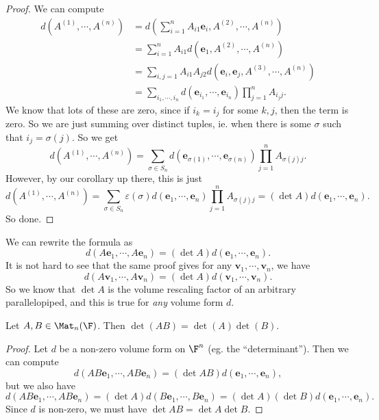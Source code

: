 \documentclass[a4paper]{article}
\begin{document}
\begin{proof}
  We can compute
  \begin{align*}
    d(A^{(1)}, \cdots, A^{(n)}) &= d\left(\sum_{i = 1}^n A_{i1} \mathbf{e}_i, A^{(2)}, \cdots, A^{(n)}\right)\\
    &= \sum_{i = 1}^n A_{i1} d(\mathbf{e}_1, A^{(2)}, \cdots, A^{(n)})\\
    &= \sum_{i, j = 1}A_{i1}A_{j2}d(\mathbf{e}_i, \mathbf{e}_j, A^{(3)}, \cdots, A^{(n)})\\
    &= \sum_{i_1, \cdots, i_n} d(\mathbf{e}_{i_1}, \cdots, \mathbf{e}_{i_n})\prod_{j = 1}^n A_{i_j j}.
  \end{align*}
  We know that lots of these are zero, since if $i_k = i_j$ for some $k, j$, then the term is zero. So we are just summing over distinct tuples, ie. when there is some $\sigma$ such that $i_j = \sigma(j)$. So we get
  \[
    d(A^{(1)}, \cdots, A^{(n)}) = \sum_{\sigma \in S_n} d(\mathbf{e}_{\sigma(1)}, \cdots, \mathbf{e}_{\sigma(n)})\prod_{j = 1}^n A_{\sigma(j)j}.
  \]
  However, by our corollary up there, this is just
  \[
    d(A^{(1)}, \cdots, A^{(n)}) = \sum_{\sigma \in S_n} \varepsilon(\sigma) d(\mathbf{e}_1, \cdots, \mathbf{e}_n) \prod_{j = 1}^n A_{\sigma(j)j} = (\det A) d(\mathbf{e}_1, \cdots, \mathbf{e}_n).
  \]
  So done.
\end{proof}
We can rewrite the formula as
\[
  d (A \mathbf{e}_1, \cdots, A\mathbf{e}_n) = (\det A)d(\mathbf{e}_1, \cdots, \mathbf{e}_n).
\]
It is not hard to see that the same proof gives for any $\mathbf{v}_1, \cdots, \mathbf{v}_n$, we have
\[
  d(A\mathbf{v}_1, \cdots, A\mathbf{v}_n) = (\det A)d(\mathbf{v}_1, \cdots, \mathbf{v}_n).
\]
So we know that $\det A$ is the volume rescaling factor of an arbitrary parallelopiped, and this is true for \emph{any} volume form $d$.

\begin{thm}
  Let $A, B \in \Mat_n(\F)$. Then $\det(AB) = \det(A)\det(B)$.
\end{thm}

\begin{proof}
  Let $d$ be a non-zero volume form on $\F^n$ (eg. the ``determinant''). Then we can compute
  \[
    d(AB\mathbf{e}_1,\cdots , AB\mathbf{e}_n) = (\det AB) d(\mathbf{e}_1,\cdots, \mathbf{e}_n),
  \]
  but we also have
  \[
    d(AB\mathbf{e}_1, \cdots, AB\mathbf{e}_n) = (\det A) d(B\mathbf{e}_1, \cdots, B\mathbf{e}_n) = (\det A)(\det B)d(\mathbf{e}_1, \cdots, \mathbf{e}_n).
  \]
  Since $d$ is non-zero, we must have $\det AB = \det A \det B$.
\end{proof}
\end{document}
